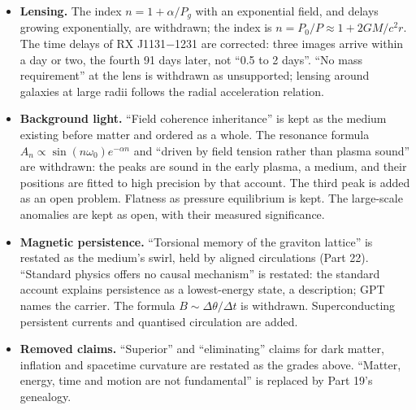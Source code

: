 \begin{itemize}
\item \textbf{Lensing.} The index $n = 1+\alpha/P_g$ with an exponential field, and delays growing exponentially, are withdrawn; the index is $n = P_0/P \approx 1+2GM/c^2r$. The time delays of RX J1131$-$1231 are corrected: three images arrive within a day or two, the fourth 91 days later, not ``0.5 to 2 days''. ``No mass requirement'' at the lens is withdrawn as unsupported; lensing around galaxies at large radii follows the radial acceleration relation.
\item \textbf{Background light.} ``Field coherence inheritance'' is kept as the medium existing before matter and ordered as a whole. The resonance formula $A_n \propto \sin(n\omega_0)e^{-\alpha n}$ and ``driven by field tension rather than plasma sound'' are withdrawn: the peaks are sound in the early plasma, a medium, and their positions are fitted to high precision by that account. The third peak is added as an open problem. Flatness as pressure equilibrium is kept. The large-scale anomalies are kept as open, with their measured significance.
\item \textbf{Magnetic persistence.} ``Torsional memory of the graviton lattice'' is restated as the medium's swirl, held by aligned circulations (Part 22). ``Standard physics offers no causal mechanism'' is restated: the standard account explains persistence as a lowest-energy state, a description; GPT names the carrier. The formula $B \sim \Delta\theta/\Delta t$ is withdrawn. Superconducting persistent currents and quantised circulation are added.
\item \textbf{Removed claims.} ``Superior'' and ``eliminating'' claims for dark matter, inflation and spacetime curvature are restated as the grades above. ``Matter, energy, time and motion are not fundamental'' is replaced by Part 19's genealogy.
\end{itemize}


